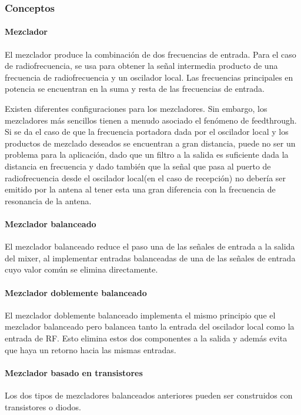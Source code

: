 \subsubsection{Conceptos}\label{sec:0z1z0Conceptos}
\paragraph{Mezclador}
El mezclador produce la combinación de dos frecuencias de entrada. Para el caso de radiofrecuencia, se usa para obtener la señal intermedia producto de una frecuencia de radiofrecuencia y un oscilador local. 
Las frecuencias principales en potencia se encuentran en la suma y resta de las frecuencias de entrada. \cite{notasCurso}

Existen diferentes configuraciones para los mezcladores. Sin embargo, los mezcladores más sencillos tienen a menudo asociado el fenómeno de feedthrough. Si se da el caso de que la frecuencia portadora dada por el oscilador local y los productos de mezclado deseados se encuentran a gran distancia, puede no ser un problema para la aplicación, dado que un filtro a la salida es suficiente dada la distancia en frecuencia y dado también que la señal que pasa al puerto de radiofrecuencia desde el oscilador local(en el caso de recepción) no debería ser emitido por la antena al tener esta una gran diferencia con la frecuencia de resonancia de la antena. 
\paragraph{Mezclador balanceado}
El mezclador balanceado reduce el paso una de las señales de entrada a la salida del mixer, al implementar entradas balanceadas de una de las señales de entrada cuyo valor común se elimina directamente. 

\paragraph{Mezclador doblemente balanceado}
El mezclador doblemente balanceado implementa el mismo principio que el mezclador balanceado pero balancea tanto la entrada del oscilador local como la entrada de RF. Esto elimina estos dos componentes a la salida y además evita que haya un retorno hacia las mismas entradas. 

\paragraph{Mezclador basado en transistores}
Los dos tipos de mezcladores balanceados anteriores pueden ser construidos con transistores o diodos. 